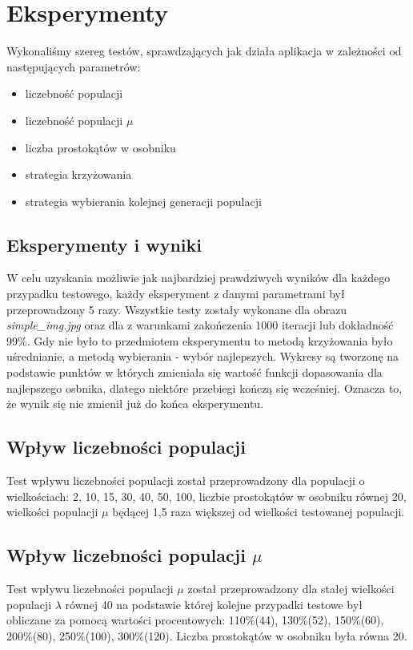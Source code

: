 \section{Eksperymenty}
Wykonaliśmy szereg testów, sprawdzających jak działa aplikacja w zależności od następujących parametrów:
\begin{itemize}
    \item liczebność populacji
    \item liczebność populacji $\mu$
    \item liczba prostokątów w osobniku
    \item strategia krzyżowania
    \item strategia wybierania kolejnej generacji populacji
\end{itemize}

\subsection{Eksperymenty i wyniki}
W celu uzyskania możliwie jak najbardziej prawdziwych wyników dla każdego przypadku testowego, każdy eksperyment z danymi parametrami był przeprowadzony 5 razy. Wszystkie testy zostały wykonane dla obrazu {\it simple\_img.jpg} oraz dla z warunkami zakończenia 1000 iteracji lub dokładność 99\%. Gdy nie było to przedmiotem eksperymentu to metodą krzyżowania było uśrednianie, a metodą wybierania - wybór najlepszych. Wykresy są tworzonę na podstawie punktów w których zmieniała się wartość funkcji dopasowania dla najlepszego osbnika, dlatego niektóre przebiegi kończą się wcześniej. Oznacza to, że wynik się nie zmienił już do końca eksperymentu.

\subsection*{Wpływ liczebności populacji}
Test wpływu liczebności populacji został przeprowadzony dla populacji o wielkościach: 2, 10, 15, 30, 40, 50, 100, liczbie prostokątów w osobniku równej 20, wielkości populacji $\mu$ będącej 1,5 raza większej od wielkości testowanej populacji.

\subsection*{Wpływ liczebności populacji $\mu$}
Test wpływu liczebności populacji $\mu$ został przeprowadzony dla stałej wielkości populacji $\lambda$ równej 40 na podstawie której kolejne przypadki testowe był obliczane za pomocą wartości procentowych: 110\%(44), 130\%(52),
150\%(60), 200\%(80), 250\%(100), 300\%(120). Liczba prostokątów w osobniku była równa 20.

